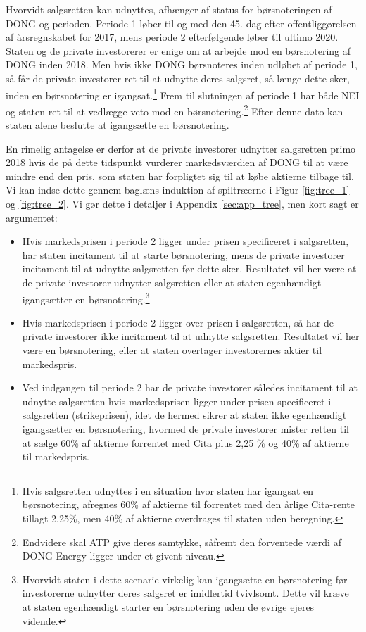 \documentclass{article}
\begin{document}
Hvorvidt salgsretten kan udnyttes, afhænger af status for børsnoteringen af DONG og perioden. Periode 1 løber til og med den 45. dag efter offentliggørelsen af årsregnskabet for 2017, mens periode 2 efterfølgende løber til ultimo 2020. Staten og de private investorerer er enige om at arbejde mod en børsnotering af DONG inden 2018. Men hvis ikke DONG børsnoteres inden udløbet af periode 1, så får de private investorer ret til at udnytte deres salgsret, så længe dette sker, inden en børsnotering er igangsat.\footnote{Hvis salgsretten udnyttes i en situation hvor staten har igangsat en børsnotering, afregnes 60\% af aktierne til  forrentet med den årlige Cita-rente tillagt 2.25\%, men 40\% af aktierne overdrages til staten uden beregning.} Frem til slutningen af periode 1 har både NEI og staten ret til at vedlægge veto mod en børsnotering.\footnote{Endvidere skal ATP give deres samtykke, såfremt den forventede værdi af DONG Energy ligger under et givent niveau.} Efter denne dato kan staten alene beslutte at igangsætte en børsnotering.

En rimelig antagelse er derfor at de private investorer udnytter salgsretten primo 2018 hvis de på dette tidspunkt vurderer markedsværdien af DONG til at være mindre end den pris, som staten har forpligtet sig til at købe aktierne tilbage til. Vi kan indse dette gennem baglæns induktion af spiltræerne i Figur \ref{fig:tree_1} og \ref{fig:tree_2}. Vi gør dette i detaljer i Appendix \ref{sec:app_tree}, men kort sagt er argumentet:

\begin{itemize}
	\item Hvis markedsprisen i periode 2 ligger under prisen specificeret i salgsretten, har staten incitament til at starte børsnotering, mens de private investorer incitament til at udnytte salgsretten før dette sker. Resultatet vil her være at de private investorer udnytter salgsretten eller at staten egenhændigt igangsætter en børsnotering.\footnote{Hvorvidt staten i dette scenarie virkelig kan igangsætte en børsnotering før investorerne udnytter deres salgsret er imidlertid tvivlsomt. Dette vil kræve at staten egenhændigt starter en børsnotering uden de øvrige ejeres vidende.}
	\item Hvis markedsprisen i periode 2 ligger over prisen i salgsretten, så har de private investorer ikke incitament til at udnytte salgsretten. Resultatet vil her være en børsnotering, eller at staten overtager investorernes aktier til markedspris.
	\item Ved indgangen til periode 2 har de private investorer således incitament til at udnytte salgsretten hvis markedsprisen ligger under prisen specificeret i salgsretten (strikeprisen), idet de hermed sikrer at staten ikke egenhændigt igangsætter en børsnotering, hvormed de private investorer mister retten til at sælge 60\% af aktierne forrentet med Cita plus 2,25 \% og 40\% af aktierne til markedspris.
\end{itemize} 
\end{document}

